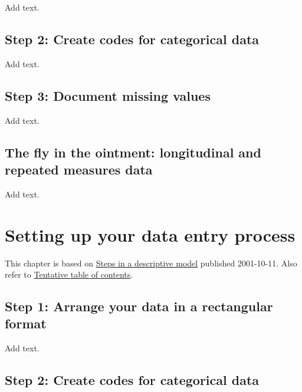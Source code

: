 \documentclass[
  letterpaper,
  DIV=11,
  numbers=noendperiod]{scrreprt}
\begin{document}
Add text.

\hypertarget{step-2-create-codes-for-categorical-data}{%
\section{Step 2: Create codes for categorical
data}\label{step-2-create-codes-for-categorical-data}}

Add text.

\hypertarget{step-3-document-missing-values}{%
\section{Step 3: Document missing
values}\label{step-3-document-missing-values}}

Add text.

\hypertarget{the-fly-in-the-ointment-longitudinal-and-repeated-measures-data}{%
\section{The fly in the ointment: longitudinal and repeated measures
data}\label{the-fly-in-the-ointment-longitudinal-and-repeated-measures-data}}

Add text.


\hypertarget{setting-up-your-data-entry-process-1}{%
\chapter{Setting up your data entry
process}\label{setting-up-your-data-entry-process-1}}

This chapter is based on
\href{http://www.pmean.com/13/descriptive.html}{Steps in a descriptive
model} published 2001-10-11. Also refer to
\href{http://www.pmean.com/10/Contents.html}{Tentative table of
contents}.

\hypertarget{step-1-arrange-your-data-in-a-rectangular-format-1}{%
\section{Step 1: Arrange your data in a rectangular
format}\label{step-1-arrange-your-data-in-a-rectangular-format-1}}

Add text.

\hypertarget{step-2-create-codes-for-categorical-data-1}{%
\section{Step 2: Create codes for categorical
data}\label{step-2-create-codes-for-categorical-data-1}}
\end{document}
